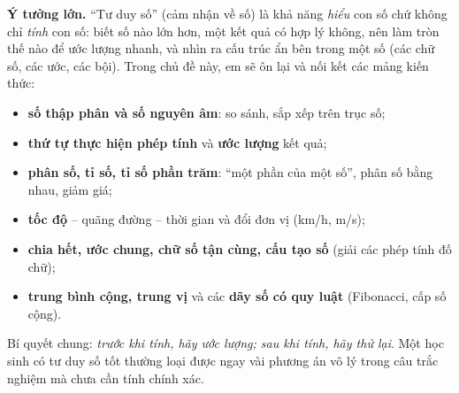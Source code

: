 \begin{knowbox}
\textbf{Ý tưởng lớn.} ``Tư duy số'' (cảm nhận về số) là khả năng \emph{hiểu} con số chứ không chỉ \emph{tính} con số:
biết số nào lớn hơn, một kết quả có hợp lý không, nên làm tròn thế nào để ước lượng nhanh, và nhìn ra cấu trúc ẩn
bên trong một số (các chữ số, các ước, các bội). Trong chủ đề này, em sẽ ôn lại và nối kết các mảng kiến thức:
\begin{itemize}[leftmargin=1.4em,itemsep=1pt,topsep=2pt]
  \item \textbf{số thập phân và số nguyên âm}: so sánh, sắp xếp trên trục số;
  \item \textbf{thứ tự thực hiện phép tính} và \textbf{ước lượng} kết quả;
  \item \textbf{phân số, tỉ số, tỉ số phần trăm}: ``một phần của một số'', phân số bằng nhau, giảm giá;
  \item \textbf{tốc độ} -- quãng đường -- thời gian và đổi đơn vị (km/h, m/s);
  \item \textbf{chia hết, ước chung, chữ số tận cùng, cấu tạo số} (giải các phép tính đố chữ);
  \item \textbf{trung bình cộng, trung vị} và các \textbf{dãy số có quy luật} (Fibonacci, cấp số cộng).
\end{itemize}
Bí quyết chung: \emph{trước khi tính, hãy ước lượng; sau khi tính, hãy thử lại}. Một học sinh có tư duy số tốt
thường loại được ngay vài phương án vô lý trong câu trắc nghiệm mà chưa cần tính chính xác.
\end{knowbox}
\vspace{0.3cm}

